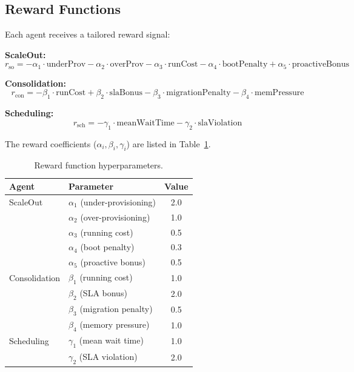 \documentclass[12pt,a4paper]{article}
\begin{document}
\subsection{Reward Functions}

Each agent receives a tailored reward signal:

\medskip\noindent
\textbf{ScaleOut:}
\[
  r_{\text{so}} = -\alpha_1 \cdot \text{underProv} - \alpha_2 \cdot \text{overProv}
                  - \alpha_3 \cdot \text{runCost} - \alpha_4 \cdot \text{bootPenalty}
                  + \alpha_5 \cdot \text{proactiveBonus}
\]

\noindent\textbf{Consolidation:}
\[
  r_{\text{con}} = -\beta_1 \cdot \text{runCost} + \beta_2 \cdot \text{slaBonus}
                   - \beta_3 \cdot \text{migrationPenalty} - \beta_4 \cdot \text{memPressure}
\]

\noindent\textbf{Scheduling:}
\[
  r_{\text{sch}} = -\gamma_1 \cdot \text{meanWaitTime} - \gamma_2 \cdot \text{slaViolation}
\]

The reward coefficients ($\alpha_i, \beta_i, \gamma_i$) are listed in
Table~\ref{tab:reward_params}.

\begin{table}[H]
\centering
\caption{Reward function hyperparameters.}
\label{tab:reward_params}
\begin{tabular}{llc}
\toprule
\textbf{Agent} & \textbf{Parameter} & \textbf{Value} \\
\midrule
ScaleOut & $\alpha_1$ (under-provisioning) & 2.0 \\
         & $\alpha_2$ (over-provisioning) & 1.0 \\
         & $\alpha_3$ (running cost) & 0.5 \\
         & $\alpha_4$ (boot penalty) & 0.3 \\
         & $\alpha_5$ (proactive bonus) & 0.5 \\
\midrule
Consolidation & $\beta_1$ (running cost) & 1.0 \\
              & $\beta_2$ (SLA bonus) & 2.0 \\
              & $\beta_3$ (migration penalty) & 0.5 \\
              & $\beta_4$ (memory pressure) & 1.0 \\
\midrule
Scheduling & $\gamma_1$ (mean wait time) & 1.0 \\
           & $\gamma_2$ (SLA violation) & 2.0 \\
\bottomrule
\end{tabular}
\end{table}
\end{document}
